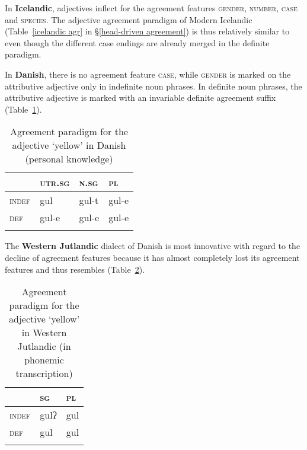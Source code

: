 In \textbf{Icelandic}, adjectives inflect for the agreement features \textsc{gender}, \textsc{number}, \textsc{case} and \textsc{species}. The adjective agreement paradigm of Modern Icelandic (Table~\ref{icelandic agr} in \S\ref{head-driven agreement}) is thus relatively similar to  even though the different case endings are already merged in the definite paradigm.

In \textbf{Danish},\label{danish synchr} there is no agreement feature \textsc{case}, while \textsc{gender} is marked on the attributive adjective only in indefinite noun phrases. In definite noun phrases, the attributive adjective is marked with an invariable definite agreement suffix (Table~\ref{danish agr paradigm}).
\begin{table}
\begin{tabular}{l l l l}
\lsptoprule
		& \textsc{utr.sg}	&\textsc{n.sg}	&\textsc{pl}\\
\midrule
\textsc{indef}	&gul	 	&gul-t		&gul-e\\

\textsc{def}	&gul-e	&gul-e		&gul-e\\
\lspbottomrule
\end{tabular}
\caption[Adjective paradigm for Danish]{Agreement paradigm for the adjective ‘yellow’ in Danish (personal knowledge)}
\label{danish agr paradigm}
\end{table}

The \textbf{Western Jutlandic} dialect of Danish is most innovative with regard to the decline of agreement features because it has almost completely lost its agreement features and thus resembles  (Table~\ref{jutl agr paradigm}).
\begin{table}
\begin{tabular}{l l l}
\lsptoprule		& \textsc{sg}	&\textsc{pl}\\
\midrule
\textsc{indef}	& gulʔ	 	&gul\\

\textsc{def}	&gul			&gul\\
\lspbottomrule
\end{tabular}
\caption[Adjective paradigm for W-Jutlandic]{Agreement paradigm for the adjective ‘yellow’ in Western Jutlandic (in phonemic transcription) \citep{ringgaard1960}}
\label{jutl agr paradigm}
\end{table}

